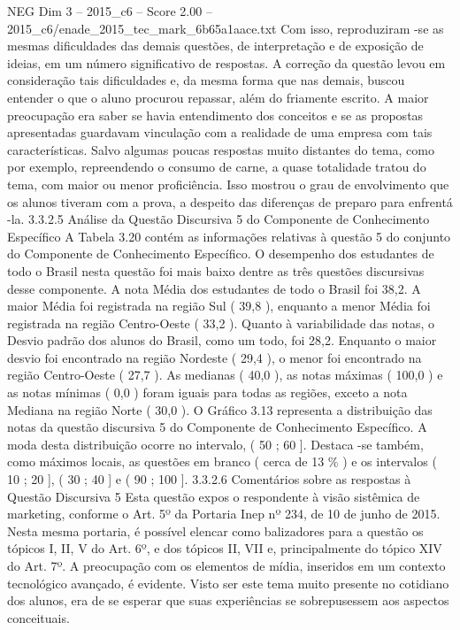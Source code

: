 \begin{textsample}{NEG Dim 3 – 2015\_c6 – Score 2.00 – 2015\_c6/enade\_2015\_tec\_mark\_6b65a1aace.txt}
Com isso, reproduziram -se as mesmas dificuldades das demais questões, de interpretação e de exposição de ideias, em um número significativo de respostas.
A correção da questão levou em consideração tais dificuldades e, da mesma forma que nas demais, buscou entender o que o aluno procurou repassar, além do friamente escrito.
A maior preocupação era saber se havia entendimento dos conceitos e se as propostas apresentadas guardavam vinculação com a realidade de uma empresa com tais características.
Salvo algumas poucas respostas muito distantes do tema, como por exemplo, repreendendo o consumo de carne, a quase totalidade tratou do tema, com maior ou menor proficiência.
Isso mostrou o grau de envolvimento que os alunos tiveram com a prova, a despeito das diferenças de preparo para enfrentá -la. 3.3.2.5 Análise da Questão Discursiva 5 do Componente de Conhecimento Específico A Tabela 3.20 contém as informações relativas à questão 5 do conjunto do Componente de Conhecimento Específico.
O desempenho dos estudantes de todo o Brasil nesta questão foi mais baixo dentre as três questões discursivas desse componente.
A nota Média dos estudantes de todo o Brasil foi 38,2.
A maior Média foi registrada na região Sul ( 39,8 ), enquanto a menor Média foi registrada na região Centro-Oeste ( 33,2 ).
Quanto à variabilidade das notas, o Desvio padrão dos alunos do Brasil, como um todo, foi 28,2.
Enquanto o maior desvio foi encontrado na região Nordeste ( 29,4 ), o menor foi encontrado na região Centro-Oeste ( 27,7 ).
As medianas ( 40,0 ), as notas máximas ( 100,0 ) e as notas mínimas ( 0,0 ) foram iguais para todas as regiões, exceto a nota Mediana na região Norte ( 30,0 ).
O Gráfico 3.13 representa a distribuição das notas da questão discursiva 5 do Componente de Conhecimento Específico.
A moda desta distribuição ocorre no intervalo, ( 50 ; 60 ].
Destaca -se também, como máximos locais, as questões em branco ( cerca de 13 \% ) e os intervalos ( 10 ; 20 ], ( 30 ; 40 ] e ( 90 ; 100 ]. 3.3.2.6 Comentários sobre as respostas à Questão Discursiva 5 Esta questão expos o respondente à visão sistêmica de marketing, conforme o Art. 5º da Portaria Inep nº 234, de 10 de junho de 2015.
Nesta mesma portaria, é possível elencar como balizadores para a questão os tópicos I, II, V do Art. 6º, e dos tópicos II, VII e, principalmente do tópico XIV do Art. 7º.
A preocupação com os elementos de mídia, inseridos em um contexto tecnológico avançado, é evidente.
Visto ser este tema muito presente no cotidiano dos alunos, era de se esperar que suas experiências se sobrepusessem aos aspectos conceituais.

\end{textsample}
